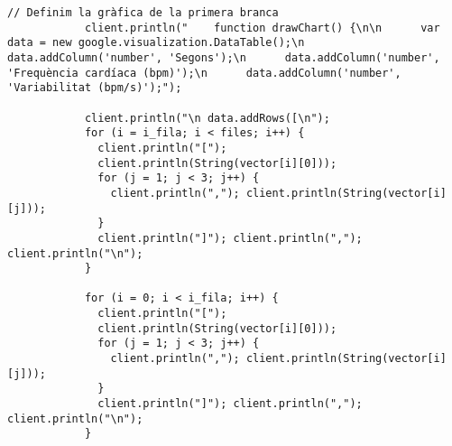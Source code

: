 \begin{lstlisting}[style=myArduino]
            // Definim la gràfica de la primera branca
            client.println("    function drawChart() {\n\n      var data = new google.visualization.DataTable();\n      data.addColumn('number', 'Segons');\n      data.addColumn('number', 'Frequència cardíaca (bpm)');\n      data.addColumn('number', 'Variabilitat (bpm/s)');");

            client.println("\n data.addRows([\n");
            for (i = i_fila; i < files; i++) {
              client.println("[");
              client.println(String(vector[i][0]));
              for (j = 1; j < 3; j++) {
                client.println(","); client.println(String(vector[i][j]));
              }
              client.println("]"); client.println(","); client.println("\n");
            }

            for (i = 0; i < i_fila; i++) {
              client.println("[");
              client.println(String(vector[i][0]));
              for (j = 1; j < 3; j++) {
                client.println(","); client.println(String(vector[i][j]));
              }
              client.println("]"); client.println(","); client.println("\n");
            }
            

\end{lstlisting}
